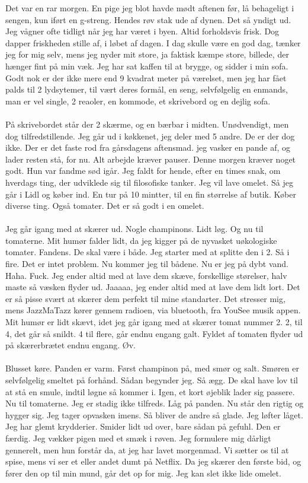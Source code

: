 \documentclass[]{article}
\begin{document}
Det var en rar morgen. En pige jeg blot havde mødt aftenen før, lå behageligt i sengen, kun iført en g-streng. Hendes røv stak ude af dynen. Det så yndigt ud. Jeg vågner ofte tidligt når jeg har været i byen. Altid forholdsvis frisk. Dog dapper friskheden stille af, i løbet af dagen. I dag skulle være en god dag, tænker jeg for mig selv, mens jeg nyder mit store, ja faktisk kæmpe store, billede, der hænger fint på min væk. Jeg har sat kaffen til at brygge, og sidder i min sofa. Godt nok er der ikke mere end 9 kvadrat meter på værelset, men jeg har fået palds til 2 lydsytemer, til vært deres formål, en seng, selvfølgelig en enmands, man er vel single, 2 reaoler, en kommode, et skrivebord og en dejlig sofa. 
\\ \\
På skrivebordet står der 2 skærme, og en bærbar i midten. Unødvendigt, men dog tilfredstillende. Jeg går ud i køkkenet, jeg deler med 5 andre. De er der dog ikke. Der er det faste rod fra gårsdagens aftensmad. jeg vasker en pande af, og lader resten stå, for nu. Alt arbejde kræver pauser. Denne morgen kræver noget godt. Hun var fandme sød igår. Jeg faldt for hende, efter en times snak, om hverdags ting, der udviklede sig til filosofiske tanker. Jeg vil lave omelet. Så jeg går i Lidl og køber ind. En tur på 10 mintter, til en fin størrelse af butik. Køber diverse ting. Også tomater. Det er så godt i en omelet. 
\\ \\
Jeg går igang med at skærer ud. Nogle champinons. Lidt løg. Og nu til tomaterne. Mit humør falder lidt, da jeg kigger på de nyvasket uøkologiske tomater. Fandens. De skal være i både. Jeg starter med at splitte den i 2. Så i fire. Det er intet problem. Nu kommer jeg til bådene. Nu er jeg på dybt vand. Haha. Fuck. Jeg ender altid med at lave dem skæve, forskellige størelser, halv maste så væsken flyder ud. Jaaaaa, jeg ender altid med at lave dem lidt lort. Det er så pisse svært at skærer dem perfekt til mine standarter. Det stresser mig, mens JazzMaTazz kører gennem radioen, via bluetooth, fra YouSee musik appen. Mit humør er lidt skævt, idet jeg går igang med at skærer tomat nummer 2. 2, til 4, det går så snildt. 4 til flere, går endnu engang galt. Fyldet af tomaten flyder ud på skærerbrætet endnu engang. Øv.
\\ \\ 
Blusset køre. Panden er varm. Først champinon på, med smør og salt. Smøren er selvfølgelig smeltet på forhånd. Sådan begynder jeg. Så ægg. De skal have lov til at stå en smule, indtil løgne så kommer i. Igen, et kort øjeblik lader sig passere. Nu til tomaterne. Jeg er stadig ikke tilfreds. Låg på panden. Nu står den rigtig og hygger sig. Jeg tager opvasken imens. Så bliver de andre så glade. Jeg løfter låget. Jeg har glemt krydderier. Smider lidt ud over, bare sådan på gefuhl. Den er færdig. Jeg vækker pigen med et smæk i røven. Jeg formulere mig dårligt gennerelt, men hun forstår da, at jeg har lavet morgenmad. Vi sætter os til at spise, mens vi ser et eller andet dumt på Netflix. Da jeg skærer den første bid, og fører den op til min mund, går det op for mig. Jeg kan slet ikke lide omelet.
\end{document}
